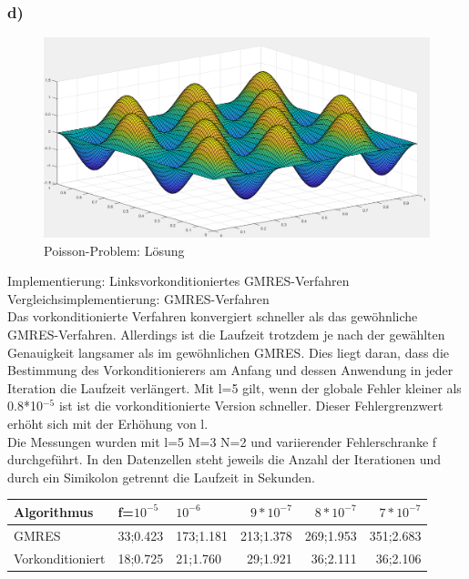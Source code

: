 \documentclass{article}
\begin{document}
\subsubsection{d)}
\begin{figure}
	\includegraphics[width=\linewidth]{Aufgaben-Ressourcen/A6L7M3N2.png}
		\caption{Poisson-Problem: Lösung}
\end{figure}

Implementierung: Linksvorkonditioniertes GMRES-Verfahren\\
Vergleichsimplementierung: GMRES-Verfahren\\
Das vorkonditionierte Verfahren konvergiert schneller als das gewöhnliche GMRES-Verfahren. Allerdings ist die Laufzeit trotzdem je nach der gewählten Genauigkeit langsamer als im gewöhnlichen GMRES. Dies liegt daran, dass die Bestimmung des Vorkonditionierers am Anfang und dessen Anwendung in jeder Iteration die Laufzeit verlängert. Mit l=5 gilt, wenn der globale Fehler kleiner als 0.8*10$^{-5}$ ist ist die vorkonditionierte Version schneller. Dieser Fehlergrenzwert erhöht sich mit der Erhöhung von l.\\
Die Messungen wurden mit l=5 M=3 N=2 und variierender Fehlerschranke f durchgeführt. In den Datenzellen steht jeweils die Anzahl der Iterationen und durch ein Simikolon getrennt die Laufzeit in Sekunden.\\

\begin{tabular}{|l|l|l|r|r|r|}
	\hline
	Algorithmus&f=$10^{-5}$ &$10^{-6}$&$9*10^{-7}$& $8*10^{-7}$& $7*10^{-7}$\\
	\hline
	GMRES & 33;0.423 & 173;1.181 & 213;1.378 & 269;1.953 & 351;2.683 \\
	Vorkonditioniert & 18;0.725 & 21;1.760 & 29;1.921 & 36;2.111 & 36;2.106 \\
	\hline
	
\end{tabular}
\end{document}
